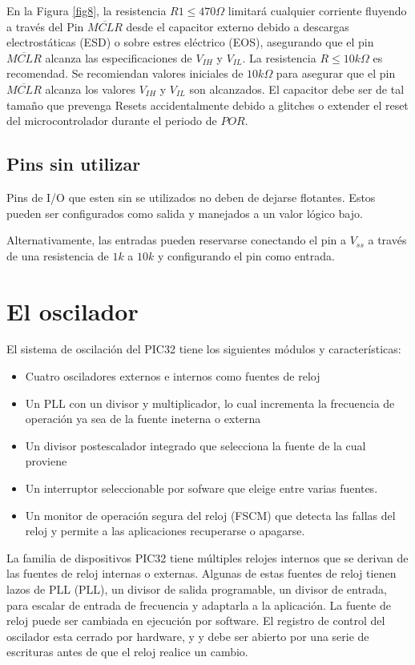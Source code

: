 \documentclass[12pt,letterpaper,twoside]{book}
\begin{document}
En la Figura \ref{fig8}, la resistencia $R1\leq 470 \Omega$  limitará cualquier corriente fluyendo a través del Pin $\overline{MCLR}$ desde el capacitor externo debido a descargas electrostáticas (ESD) o sobre estres eléctrico (EOS), asegurando que el pin $\overline{MCLR}$ alcanza las especificaciones de $V_{IH}$ y $V_{IL}$. La resistencia $R \leq 10 k \Omega $ es recomendad. Se recomiendan valores iniciales de $10 k \Omega$ para asegurar que el pin $\overline{MCLR}$ alcanza los valores $V_{IH}$ y $V_{IL}$ son alcanzados. El capacitor debe ser de tal tamaño que prevenga Resets accidentalmente debido a glitches o extender el reset del microcontrolador durante el periodo de $POR$.


\subsection{Pins sin utilizar}

Pins de I/O que esten sin se utilizados no deben de dejarse flotantes. Estos pueden ser configurados como salida y manejados a un valor lógico bajo.

Alternativamente, las entradas pueden reservarse conectando el pin a $V_{ss}$ a través de una resistencia de $1k$ a $10k$ y configurando el pin como entrada.

\section{El oscilador}

El sistema de oscilación del PIC32 tiene los siguientes módulos y características:

\begin{itemize}
\item Cuatro osciladores externos e internos como fuentes de reloj
\item Un PLL con un divisor y multiplicador, lo cual incrementa la frecuencia de operación ya sea de la fuente ineterna o externa
\item Un divisor postescalador integrado que selecciona la fuente de la cual proviene
\item Un interruptor seleccionable por sofware que eleige entre varias fuentes.
\item Un monitor de operación segura del reloj (FSCM) que detecta las fallas del reloj y permite a las aplicaciones recuperarse o apagarse.
\end{itemize}

La familia de dispositivos PIC32 tiene múltiples relojes internos que se derivan de las fuentes de reloj internas o externas. Algunas de estas fuentes de reloj tienen lazos de PLL (PLL), un divisor de salida programable, un divisor de entrada, para escalar de entrada de frecuencia y adaptarla a la aplicación. La fuente de reloj puede ser cambiada en ejecución por software. El registro de control del oscilador esta cerrado  por hardware, y y debe ser abierto por una serie de escrituras antes de que el reloj realice un cambio.
\end{document}
